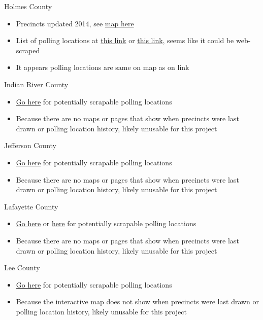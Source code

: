 \documentclass[12pt]{article}
\begin{document}
Holmes County
\begin{itemize}
  \item Precincts updated 2014, see \href{https://www.holmeselections.com/Portals/Holmes/Documents/Precinct%20Map.pdf?ver=2014-02-07-162932-680}{map here}
  \item List of polling locations at \href{https://www.voterfocus.com/PrecinctFinder/precinctDirectory?county=FL-HOL}{this link} or \href{https://www.holmeselections.com/Where-Do-I-Vote/Election-Day-Voting-Locations}{this link}, seems like it could be web-scraped
  \item It appears polling locations are same on map as on link
\end{itemize}
Indian River County
\begin{itemize}
  \item \href{https://www.voterfocus.com/PrecinctFinder/precinctDirectory?county=FL-IND}{Go here} for potentially scrapable polling locations
  \item Because there are no maps or pages that show when precincts were last drawn or polling location history, likely unusable for this project
\end{itemize}
Jefferson County
\begin{itemize}
  \item \href{https://www.voterfocus.com/PrecinctFinder/precinctDirectory?county=FL-JEF}{Go here} for potentially scrapable polling locations
  \item Because there are no maps or pages that show when precincts were last drawn or polling location history, likely unusable for this project
\end{itemize}
Lafayette County
\begin{itemize}
  \item \href{https://www.voterfocus.com/PrecinctFinder/precinctDirectory?county=FL-LAF}{Go here} or \href{https://www.lafayettevotes.net/m/Voter-Information/Polling-Places}{here} for potentially scrapable polling locations
  \item Because there are no maps or pages that show when precincts were last drawn or polling location history, likely unusable for this project
\end{itemize}
Lee County
\begin{itemize}
  \item \href{https://www.voterfocus.com/PrecinctFinder/precinctDirectory?county=FL-LEE}{Go here} for potentially scrapable polling locations
  \item Because the interactive map does not show when precincts were last drawn or polling location history, likely unusable for this project
\end{itemize}
\end{document}
